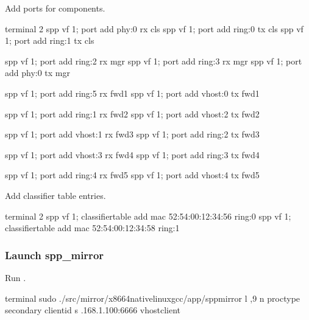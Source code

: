 \documentclass[a4paper,11pt,openany,oneside,english]{sphinxmanual}
\begin{document}
Add ports for components.

\begin{sphinxVerbatim}[commandchars=\\\{\},formatcom=\footnotesize]
\PYGZsh{} terminal 2
spp \PYGZgt{} vf 1; port add phy:0 rx cls
spp \PYGZgt{} vf 1; port add ring:0 tx cls
spp \PYGZgt{} vf 1; port add ring:1 tx cls

spp \PYGZgt{} vf 1; port add ring:2 rx mgr
spp \PYGZgt{} vf 1; port add ring:3 rx mgr
spp \PYGZgt{} vf 1; port add phy:0 tx mgr

spp \PYGZgt{} vf 1; port add ring:5 rx fwd1
spp \PYGZgt{} vf 1; port add vhost:0 tx fwd1

spp \PYGZgt{} vf 1; port add ring:1 rx fwd2
spp \PYGZgt{} vf 1; port add vhost:2 tx fwd2

spp \PYGZgt{} vf 1; port add vhost:1 rx fwd3
spp \PYGZgt{} vf 1; port add ring:2 tx fwd3

spp \PYGZgt{} vf 1; port add vhost:3 rx fwd4
spp \PYGZgt{} vf 1; port add ring:3 tx fwd4

spp \PYGZgt{} vf 1; port add ring:4 rx fwd5
spp \PYGZgt{} vf 1; port add vhost:4 tx fwd5
\end{sphinxVerbatim}

Add classifier table entries.

\begin{sphinxVerbatim}[commandchars=\\\{\},formatcom=\footnotesize]
\PYGZsh{} terminal 2
spp \PYGZgt{} vf 1; classifier\PYGZus{}table add mac 52:54:00:12:34:56 ring:0
spp \PYGZgt{} vf 1; classifier\PYGZus{}table add mac 52:54:00:12:34:58 ring:1
\end{sphinxVerbatim}


\subsubsection{Launch spp\_mirror}
\label{\detokenize{usecases/spp_mirror:id2}}
Run .

\begin{sphinxVerbatim}[commandchars=\\\{\},formatcom=\footnotesize]
 terminal 
 sudo ./src/mirror/x86\PYGZus{}64\PYGZhy{}native\PYGZhy{}linux\PYGZhy{}gcc/app/spp\PYGZus{}mirror 
  \PYGZhy{}l ,9 
  \PYGZhy{}n  \PYGZhy{}\PYGZhy{}proc\PYGZhy{}type secondary 
  \PYGZhy{}\PYGZhy{} 
  \PYGZhy{}\PYGZhy{}client\PYGZhy{}id  
  \PYGZhy{}s .168.1.100:6666 
  \PYGZhy{}\PYGZhy{}vhost\PYGZhy{}client
\end{sphinxVerbatim}
\end{document}
